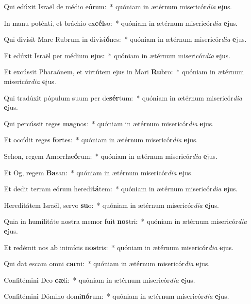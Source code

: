 \item Qui edúxit Israël de médio e\textbf{ó}rum:~* quóniam in ætérnum misericór\textit{di}\textit{a} \textbf{e}jus.
\item In manu poténti, et bráchio ex\textbf{cél}so:~* quóniam in ætérnum misericór\textit{di}\textit{a} \textbf{e}jus.
\item Qui divísit Mare Rubrum in divisi\textbf{ó}nes:~* quóniam in ætérnum misericór\textit{di}\textit{a} \textbf{e}jus.
\item Et edúxit Israël per médium \textbf{e}jus:~* quóniam in ætérnum misericór\textit{di}\textit{a} \textbf{e}jus.
\item Et excússit Pharaónem, et virtútem ejus in Mari \textbf{Ru}bro:~* quóniam in ætérnum misericór\textit{di}\textit{a} \textbf{e}jus.
\item Qui tradúxit pópulum suum per de\textbf{sér}tum:~* quóniam in ætérnum misericór\textit{di}\textit{a} \textbf{e}jus.
\item Qui percússit reges \textbf{ma}gnos:~* quóniam in ætérnum misericór\textit{di}\textit{a} \textbf{e}jus.
\item Et occídit reges \textbf{for}tes:~* quóniam in ætérnum misericór\textit{di}\textit{a} \textbf{e}jus.
\item Sehon, regem Amorrhæ\textbf{ó}rum:~* quóniam in ætérnum misericór\textit{di}\textit{a} \textbf{e}jus.
\item Et Og, regem \textbf{Ba}san:~* quóniam in ætérnum misericór\textit{di}\textit{a} \textbf{e}jus.
\item Et dedit terram eórum heredi\textbf{tá}tem:~* quóniam in ætérnum misericór\textit{di}\textit{a} \textbf{e}jus.
\item Hereditátem Israël, servo \textbf{su}o:~* quóniam in ætérnum misericór\textit{di}\textit{a} \textbf{e}jus.
\item Quia in humilitáte nostra memor fuit \textbf{nos}tri:~* quóniam in ætérnum misericór\textit{di}\textit{a} \textbf{e}jus.
\item Et redémit nos ab inimícis \textbf{nos}tris:~* quóniam in ætérnum misericór\textit{di}\textit{a} \textbf{e}jus.
\item Qui dat escam omni \textbf{car}ni:~* quóniam in ætérnum misericór\textit{di}\textit{a} \textbf{e}jus.
\item Confitémini Deo \textbf{cæ}li:~* quóniam in ætérnum misericór\textit{di}\textit{a} \textbf{e}jus.
\item Confitémini Dómino domi\textbf{nó}rum:~* quóniam in ætérnum misericór\textit{di}\textit{a} \textbf{e}jus.
